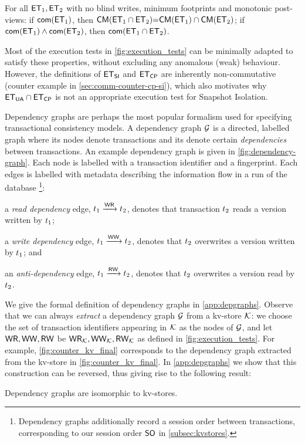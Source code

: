 \begin{theorem}[Compositionality]     
For all $\mathsf{ET}_1, \mathsf{ET}_2$ with no blind writes, minimum footprints and monotonic post-views: 
if $\mathsf{com}(\mathsf{ET}_1)$, 
then $\mathsf{CM}(\mathsf{ET}_1 \cap \mathsf{ET}_2) {=} \mathsf{CM}(\mathsf{ET}_1) \cap \mathsf{CM}(\mathsf{ET}_2)$;
if $\mathsf{com}(\mathsf{ET}_1) \land \mathsf{com}(\mathsf{ET}_2)$, then $\mathsf{com}(\mathsf{ET}_1 \cap \mathsf{ET}_2)$.

Most of the execution tests in \cref{fig:execution_tests} can be minimally adapted to satisfy these 
properties, without excluding any anomalous (weak) behaviour. However, the definitions 
of $\mathsf{ET}_{\mathsf{SI}}$ and $\mathsf{ET}_{\mathsf{CP}}$ are inherently non-commutative (counter example in \cref{sec:comm-counter-cp-si}), which also motivates 
why $\mathsf{ET}_{\mathsf{UA}} \cap \mathsf{ET}_{\mathsf{CP}}$ is not an appropriate execution test for Snapshot Isolation.

Dependency graphs \cite{adya-icde,adya} are perhaps the most popular 
formalism used for specifying transactional consistency models. 
A dependency graph $\mathcal{G}$ is a directed, labelled graph where its
nodes denote transactions and its denote certain \emph{dependencies} between transactions.  
An example dependency graph is given in \cref{fig:dependency-graph}.
Each node is labelled with a transaction identifier and a fingerprint.
Each edges is labelled with metadata describing the information flow in a run of the database%
\footnote{Dependency graphs additionally record a session order between transactions, corresponding to our session order $\mathsf{SO}$ in \cref{subsec:kvstores}.}:
\begin{enumerate*}
	\item a \emph{read dependency} edge, $t_1 \xrightarrow{\mathsf{WR}} t_2$, denotes
that transaction $t_2$ reads a version written by $t_1$;
	\item a \emph{write dependency} edge, $t_1 \xrightarrow{\mathsf{WW}} t_2$, denotes that $t_2$ overwrites a version written by $t_1$; and 
	\item an \emph{anti-dependency} edge, $t_1 \xrightarrow{\mathsf{RW}} t_2$, denotes that $t_2$ overwrites a version read by $t_2$. 
\end{enumerate*}
We give the formal definition of dependency graphs in \cref{app:depgraphs}.
Observe that we can always \emph{extract} a dependency graph  $\mathcal{G}$ from a kv-store $\mathcal{K}$:
we choose the set of transaction identifiers appearing in $\mathcal{K}$ as the nodes of $\mathcal{G}$, 
and let $\mathsf{WR}, \mathsf{WW}, \mathsf{RW}$ be $\mathsf{WR}_{\mathcal{K}}, \mathsf{WW}_{\mathcal{K}}, \mathsf{RW}_{\mathcal{K}}$ as defined in \cref{fig:execution_tests}.
For example, \cref{fig:counter_kv_final} corresponds to the dependency graph extracted from the kv-store in \cref{fig:counter_kv_final}.
In \cref{app:depgraphs} we show that this construction can be reversed, thus giving 
rise to the following result: 
\begin{theorem}
\label{thm:kv_graph_isomorph}
Dependency graphs are isomorphic to kv-stores.
\end{theorem}


\end{theorem}

